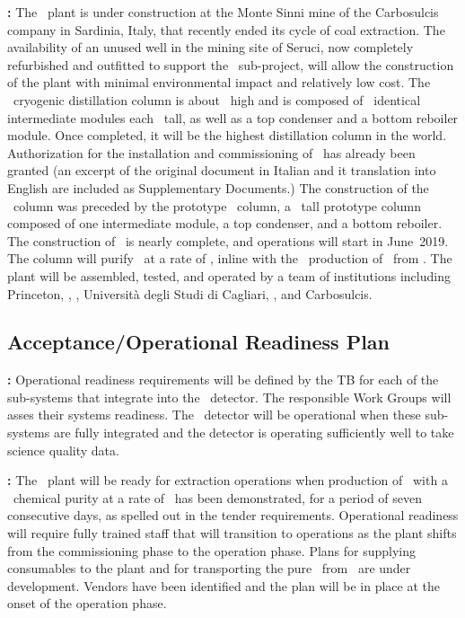 \textbf{\Aria:} The \Aria\ plant is under construction at the Monte Sinni mine of the Carbosulcis company in Sardinia, Italy, that recently ended its cycle of coal extraction. The availability of an unused well in the mining site of Seruci, now completely refurbished and outfitted to support the \Aria\ sub-project, will allow the construction of the plant with minimal environmental impact and relatively low cost.  The \SeruciOne\ cryogenic distillation column is about \AriaSeruciHeight\ high and is composed of \AriaCentralModulesNumber\ identical intermediate modules each \AriaCentralModulesHeight\ tall, as well as a top condenser and a bottom reboiler module.  Once completed, it will be the highest distillation column in the world.  Authorization for the installation and commissioning of \SeruciOne\ has already been granted (an excerpt of the original document in Italian and it translation into English are included as Supplementary Documents.)  The construction of the \SeruciOne\ column was preceded by the prototype \SeruciZero\ column, a \AriaSeruciZeroHeight\ tall prototype column composed of one intermediate module, a top condenser, and a bottom reboiler.  The construction of \SeruciZero\ is nearly complete, and operations will start in June~2019.  The column will purify \UAr\ at a rate of \AriaChemicalRate, inline with the \UraniaUArRate\ production of \UAr\ from \Urania.  The plant will be assembled, tested, and operated by a team of institutions including Princeton, \INFN, \CERN, Universit\`a degli Studi di Cagliari, \FNAL, and Carbosulcis.


\subsection{Acceptance/Operational Readiness Plan}
\textbf{\DSks:} Operational readiness requirements will be defined by the TB for each of the sub-systems that integrate into the \DSks\ detector. The responsible Work Groups will asses their systems readiness. The \DSks\ detector will be operational when these sub-systems are fully integrated and the detector is operating sufficiently well to take science quality data.

\textbf{\Urania:} The \Urania\ plant will be ready for extraction operations when production of \UAr\ with a \UraniaArFinalPurity\ chemical purity at a rate of \UraniaUArRate\ has been demonstrated, for a period of seven consecutive days, as spelled out in the tender requirements. Operational readiness will require fully trained staff that will transition to operations as the plant shifts from the commissioning phase to the operation phase. Plans for supplying consumables to the plant and for transporting the pure \UAr\ from \Urania\ are under development. Vendors have been identified and the plan will be in place at the onset of the operation phase.

